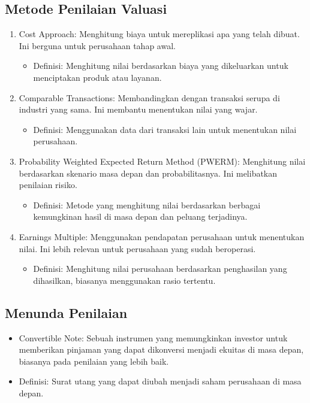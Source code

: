 \documentclass{article}
\begin{document}
\subsection{Metode Penilaian Valuasi}
\begin{enumerate}
    \item Cost Approach: Menghitung biaya untuk mereplikasi apa yang telah dibuat. Ini berguna untuk perusahaan tahap awal.
          \begin{itemize}
              \item Definisi: Menghitung nilai berdasarkan biaya yang dikeluarkan untuk menciptakan produk atau layanan.
          \end{itemize}
    \item Comparable Transactions: Membandingkan dengan transaksi serupa di industri yang sama. Ini membantu menentukan nilai yang wajar.
          \begin{itemize}
              \item Definisi: Menggunakan data dari transaksi lain untuk menentukan nilai perusahaan.
          \end{itemize}
    \item Probability Weighted Expected Return Method (PWERM): Menghitung nilai berdasarkan skenario masa depan dan probabilitasnya. Ini melibatkan penilaian risiko.
          \begin{itemize}
              \item Definisi: Metode yang menghitung nilai berdasarkan berbagai kemungkinan hasil di masa depan dan peluang terjadinya.
          \end{itemize}
    \item Earnings Multiple: Menggunakan pendapatan perusahaan untuk menentukan nilai. Ini lebih relevan untuk perusahaan yang sudah beroperasi.
          \begin{itemize}
              \item Definisi: Menghitung nilai perusahaan berdasarkan penghasilan yang dihasilkan, biasanya menggunakan rasio tertentu.
          \end{itemize}
\end{enumerate}

\subsection{Menunda Penilaian}
\begin{itemize}
    \item Convertible Note: Sebuah instrumen yang memungkinkan investor untuk memberikan pinjaman yang dapat dikonversi menjadi ekuitas di masa depan, biasanya pada penilaian yang lebih baik.
    \item Definisi: Surat utang yang dapat diubah menjadi saham perusahaan di masa depan.
\end{itemize}
\end{document}
